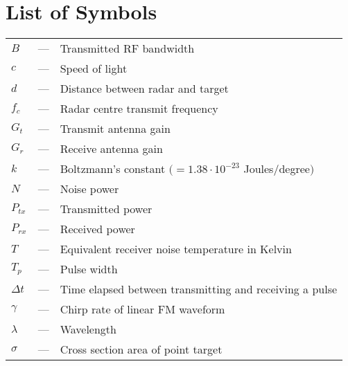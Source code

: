                       

\chapter*{List of Symbols}


\begin{tabular}{lll}
$B$ & --- & Transmitted RF bandwidth \\ 
$c$ & --- & Speed of light \\ 
$d$ & --- & Distance between radar and target \\ 
$f_{c}$ & --- & Radar centre transmit frequency \\ 
$G_{t}$ & --- & Transmit antenna gain \\ 
$G_{r}$ & --- & Receive antenna gain \\ 
$k$ & --- & Boltzmann's constant $(=1.38\cdot 10^{-23}$ Joules/degree$)$ \\ 
$N$ & --- & Noise power \\ 
$P_{tx}$ & --- & Transmitted power \\ 
$P_{rx}$ & --- & Received power \\ 
$T$ & --- & Equivalent receiver noise temperature in Kelvin \\ 
$T_{p}$ & --- & Pulse width \\ 
$\Delta t$ & --- & Time elapsed between transmitting and receiving a pulse
\\ 
$\gamma $ & --- & Chirp rate of linear FM waveform \\ 
$\lambda $ & --- & Wavelength \\ 
$\sigma $ & --- & Cross section area of point target
\end{tabular}
